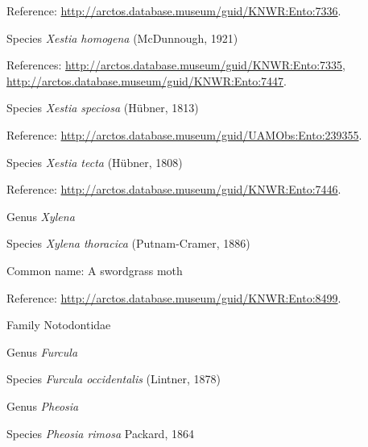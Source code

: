 \documentclass[9pt, article]{memoir}
\begin{document}
\begin{multicols}{2}
Reference: 
\url{http://arctos.database.museum/guid/KNWR:Ento:7336}.

\vspace{6pt}\noindent\hspace{36pt}Species \textit{Xestia homogena} (McDunnough, 1921)


References: 
\url{http://arctos.database.museum/guid/KNWR:Ento:7335}, 
\url{http://arctos.database.museum/guid/KNWR:Ento:7447}.

\vspace{6pt}\noindent\hspace{36pt}Species \textit{Xestia speciosa} (Hübner, 1813)


Reference: 
\url{http://arctos.database.museum/guid/UAMObs:Ento:239355}.

\vspace{6pt}\noindent\hspace{36pt}Species \textit{Xestia tecta} (Hübner, 1808)


Reference: 
\url{http://arctos.database.museum/guid/KNWR:Ento:7446}.

\vspace{6pt}\noindent\hspace{30pt}Genus \textit{Xylena}


\vspace{6pt}\noindent\hspace{36pt}Species \textit{Xylena thoracica} (Putnam-Cramer, 1886)


Common name: A swordgrass moth

Reference: 
\url{http://arctos.database.museum/guid/KNWR:Ento:8499}.

\vspace{6pt}\noindent\hspace{24pt}Family Notodontidae


\vspace{6pt}\noindent\hspace{30pt}Genus \textit{Furcula}


\vspace{6pt}\noindent\hspace{36pt}Species \textit{Furcula occidentalis} (Lintner, 1878)


\vspace{6pt}\noindent\hspace{30pt}Genus \textit{Pheosia}


\vspace{6pt}\noindent\hspace{36pt}Species \textit{Pheosia rimosa} Packard, 1864



\end{multicols}
\end{document}
